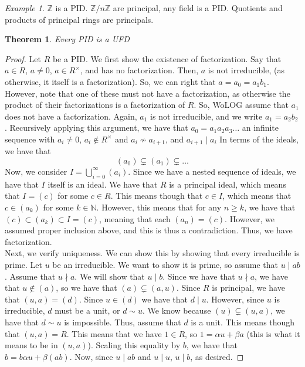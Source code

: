 \documentclass{amsart}
\newcommand{\NN}{\mathbb{N}}
\newcommand{\ZZ}{\mathbb{Z}}
\newcommand{\Zn}[1]{\mathbb{Z} / #1 \mathbb{Z}}
\newtheorem{thm}{Theorem}[section]
\theoremstyle{definition}
\theoremstyle{remark}
\newtheorem*{ex}{Example}
\begin{document}
\begin{ex}
    $\ZZ$ is a PID. $\Zn n$ are principal, any field is a PID. Quotients and products
    of principal rings are principals.
\end{ex}
\begin{thm}
    Every PID is a UFD
\end{thm}
\begin{proof}
    Let $R$ be a PID. We first show the existence of factorization. Say that
    $a \in R$, $a \neq 0$, $a \in R^\times$, and has no factorization. Then,
    $a$ is not irreducible, (as otherwise, it itself is a factorization). So,
    we can right that $a = a_0 = a_1b_1$. However, note that one of these must
    not have a factorization, as otherwise the product of their factorizations
    is a factorization of $R$. So, WoLOG assume that $a_1$ does not have a factorization.
    Again, $a_1$ is not irreducible, and we write $a_1 = a_2b_2$. Recursively
    applying this argument, we have that $a_0 = a_1a_2a_3 \dots$ an infinite sequence with
    $a_i \neq 0$, $a_i \notin R^\times$ and $a_i \not\sim a_{i+1}$, and $a_{i+1} \mid a_{i}$
    In terms of the ideals, we have that
    $$
    (a_0) \subsetneq (a_1) \subsetneq \dots
    $$
    Now, we consider $I = \bigcup\limits_{i=0}^{\infty}{(a_i)}$. Since we have a
    nested sequence of ideals, we have that $I$ itself is an ideal. We have that $R$
    is a principal ideal, which means that $I = (c)$ for some $c \in R$. This means
    though that $c \in I$, which means that $c \in (a_k)$ for some $k \in \NN$.
    However, this means that for any $n \geq k$, we have that $(c) \subset (a_k) \subset I = (c)$,
    meaning that each $(a_n) = (c)$. However, we assumed proper inclusion above,
    and this is thus a contradiction. Thus, we have factorization. \\
    Next, we verify uniqueness. We can show this by showing that every irreducible is
    prime. Let $u$ be an irreducible. We want to show it is prime, so assume that $u \mid ab$.
    Assume that $u \nmid a$. We will show that $u \mid b$. Since we have that $u \nmid a$,
    we have that $u \notin (a)$, so we have that $(a) \subsetneq (a, u)$. Since
    $R$ is principal, we have that $(u, a) = (d)$. Since $u \in (d)$ we have that $d \mid u$.
    However, since $u$ is irreducible, $d$ must be a unit, or $d \sim u$. We know because
    $(u) \subsetneq (u,a)$, we have that $d \sim u$ is impossible. Thus, assume that
    $d$ is a unit. This means though that $(u,a)  = R$. This means that we have $1 \in R$,
    so $1 = \alpha u + \beta a$ (this is what it means to be in $(u,a)$). Scaling
    this equality by $b$, we have that $b = b\alpha u + \beta (ab)$. Now, since $u \mid ab$
    and $u \mid u$, $u \mid b$, as desired.
\end{proof}
\end{document}
